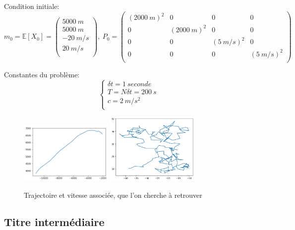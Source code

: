 \documentclass{article}
\begin{document}
Condition initiale: 
\[ m_0 = \mathbb{E}[X_0] = \left (
   \begin{array}{c}
      5000\ m \\
      5000\ m \\
      -20\ m/s \\
      20\ m/s \\
   \end{array} \right )
   ,\ P_0 = \left (
   \begin{array}{cccc}
      (2000\ m)^2 & 0 & 0 & 0 \\
      0 & (2000\ m)^2 & 0 & 0 \\
      0 & 0 & (5\ m/s)^2 & 0 \\
      0 & 0 & 0 & (5\ m/s)^2 \\
   \end{array} \right )
\]

Constantes du problème:
$$ \left\{
   \begin{array}{l}
      \delta t = 1\ seconde\\
      T = N \delta t = 200\ s \\
      c = 2\ m/s^2 \\
   \end{array} \right .$$

\begin{figure}[ht]
\centering
\includegraphics[width=0.4\textwidth]{TP2/position_réelle.png}
\includegraphics[width=0.4\textwidth]{TP2/vitesse_reelle.png}
\caption{Trajectoire et vitesse associée, que l'on cherche à retrouver}
\label{TP2_pos_vit}
\end{figure}

\subsection{Titre intermédiaire}
\end{document}
